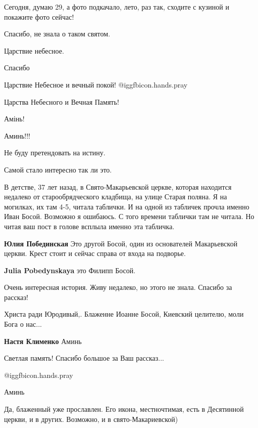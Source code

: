 \begin{itemize}
Сегодня, думаю 29, а фото подкачало, лето, раз так, сходите с кузиной и покажите фото сейчас!

Спасибо, не знала о таком святом.

Царствие небесное.

Спасибо

Царствие Небесное и вечный покой! @igg{fbicon.hands.pray} 

Царства Небесного и Вечная Память!

Амінь!


Аминь!!!


Не буду претендовать на истину.

Самой стало интересно так ли это.

В детстве, 37 лет назад, в Свято-Макарьевской церкве, которая находится
недалеко от старообрядческого кладбища, на улице Старая поляна. Я на могилках,
их там 4-5, читала таблички. И на одной из табличек прочла именно Иван Босой.
Возможно я ошибаюсь. С того времени таблички там не читала. Но читая ваш пост в
голове всплыла именно эта табличка.

\begin{itemize} %
\textbf{Юлия Побединская} Это другой Босой, один из основателей Макарьевской церкви. Крест стоит и сейчас справа от входа на подворье.

\textbf{Julia Pobedynskaya} это Филипп Босой.
\end{itemize} %

Очень интересная история. Живу недалеко, но этого не знала. Спасибо за рассказ!

Христа ради Юродивый,. Блаженне Иоанне Босой, Киевский целителю, моли Бога о нас...

\textbf{Настя Клименко} Аминь

Светлая память! Спасибо большое за Ваш рассказ...

 @igg{fbicon.hands.pray} 

Аминь


Да, блаженный уже прославлен. Его икона, местночтимая, есть в Десятинной
церкви, и в других. Возможно, и в свято-Макариевской)



\end{itemize}
